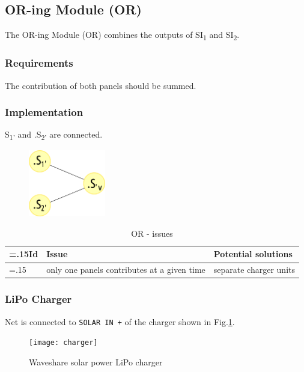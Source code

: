 \subsection{OR-ing Module (OR) }
\label{sec:OR}

The OR-ing Module (OR) combines the outputs of SI\textsubscript{1} and  SI\textsubscript{2}.


\subsubsection{Requirements}

The contribution of both panels should be summed.

\subsubsection{Implementation}

S\textsubscript{1'} and .S\textsubscript{2'} are connected.



\begin{figure}[h]
    \centering
    \includegraphics[width=0.3\textwidth]{PO/OR/OR}
\end{figure}


\begin{table}[H]
    \centering
    \begin{threeparttable}[b]
        \begin{tabularx}{\linewidth}{ >{\hsize=.15\hsize}X >{\hsize=1.35\hsize}X >{\hsize=1.5\hsize}X }
            \toprule
            Id & Issue                                       & Potential solutions    \\
            \midrule
            1  & only one panels contributes at a given time & separate charger units \\
            \bottomrule
        \end{tabularx}
    \end{threeparttable}
    \caption{OR - issues}
\end{table}



\subsubsection{LiPo Charger}

Net  is connected to \texttt{SOLAR IN +} of the charger shown in Fig.\ref{fig:wv}.

\begin{figure}[h]
    \centering
    \texttt{[image: charger]}
    \caption{Waveshare solar power LiPo charger}
    \label{fig:wv}
\end{figure}